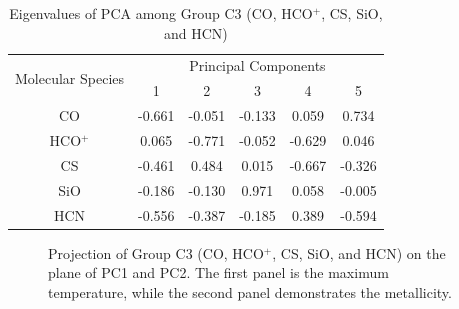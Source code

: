 \documentclass{aa}
\begin{document}
\begin{CJK*}{UTF8}{gbsn}
\begin{table}[htbp]
\centering
\begin{tabular}{cccccc}
\hline\hline
\multirow{2}{*}{Molecular Species} & \multicolumn{5}{c}{Principal Components}                 \\ \cline{2-6} 
                                   & 1       & 2       & 3       & 4       & 5 \\ \hline
CO   & -0.661 & -0.051  & -0.133 & 0.059  & 0.734 \\ \hline
HCO$^+$ & 0.065  & -0.771 & -0.052 & -0.629  & 0.046 \\ \hline
CS   & -0.461 & 0.484  & 0.015   & -0.667 & -0.326\\ \hline
SiO  & -0.186 & -0.130 & 0.971  & 0.058  & -0.005\\ \hline
HCN  & -0.556 & -0.387 & -0.185 & 0.389  & -0.594\\ \hline\hline
\end{tabular}
\caption{Eigenvalues of PCA among Group C3 (CO, HCO$^+$, CS, SiO, and HCN)} 
\label{table-5-eigen}
\end{table}

\begin{figure}[htbp]
\centering
{}
\caption{Projection of Group C3 (CO, HCO$^+$, CS, SiO, and HCN) on the plane of PC1 and PC2. The first panel is the maximum temperature, while the second panel demonstrates the metallicity.}
\label{C3-12}
\end{figure}


\end{CJK*}
\end{document}
